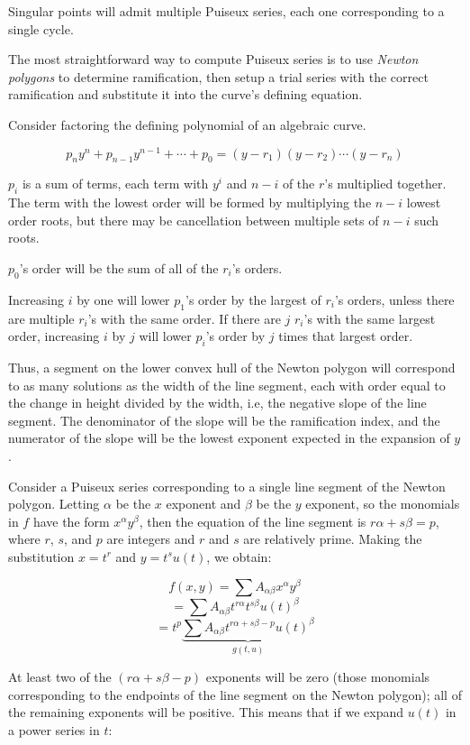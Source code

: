 Singular points will admit multiple Puiseux series, each one
corresponding to a single cycle.


The most straightforward way to compute Puiseux series is to use {\it Newton
polygons} to determine ramification, then setup a trial series with
the correct ramification and substitute it into the curve's defining
equation.

Consider factoring the defining polynomial of an algebraic curve.

$$p_n y^n + p_{n-1}y^{n-1} + \cdots + p_0 = (y-r_1)(y-r_2)\cdots(y-r_n)$$

$p_i$ is a sum of terms, each term with $y^i$ and $n-i$ of the $r$'s
multiplied together.  The term with the lowest order will be formed by
multiplying the $n-i$ lowest order roots, but there may be
cancellation between multiple sets of $n-i$ such roots.

$p_0$'s order will be the sum of all of the $r_i$'s orders.

Increasing $i$ by one will lower $p_1$'s order by the largest
of $r_i$'s orders, unless there are multiple $r_i$'s with
the same order.  If there are $j$ $r_i$'s with the same
largest order, increasing $i$ by $j$ will lower $p_i$'s
order by $j$ times that largest order.

Thus, a segment on the lower convex hull of the Newton polygon will
correspond to as many solutions as the width of the line segment, each
with order equal to the change in height divided by the width, i.e,
the negative slope of the line segment.  The denominator of the slope
will be the ramification index, and the numerator of the slope will be
the lowest exponent expected in the expansion of $y$.

Consider a Puiseux series
corresponding to a single line segment of the Newton polygon.
Letting
$\alpha$ be the $x$ exponent and $\beta$ be the $y$ exponent, so the
monomials in $f$ have the form $x^\alpha y^\beta$, then the equation
of the line segment is $r\alpha + s\beta = p$, where $r$, $s$, and $p$
are integers and $r$ and $s$ are relatively prime.  Making the
substitution $x=t^r$ and $y=t^s u(t)$, we obtain:

$$f(x,y) = \sum A_{\alpha\beta} x^\alpha y^\beta$$
$$ = \sum A_{\alpha\beta} t^{r \alpha} t^{s \beta} u(t)^\beta$$
$$ = t^p \underbrace{\sum A_{\alpha\beta} t^{r \alpha + s \beta - p} u(t)^\beta}_{g(t,u)}$$

At least two of the $(r \alpha + s \beta - p)$ exponents will be zero
(those monomials corresponding to the endpoints of the line segment on
the Newton polygon); all of the remaining exponents will be positive.
This means that if we expand $u(t)$ in a power series in $t$:

